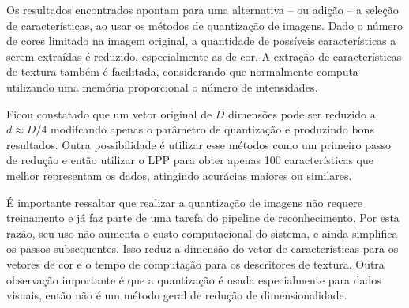 


Os resultados encontrados apontam para uma alternativa -- ou adição -- a seleção de características, ao usar os métodos de quantização de imagens. Dado o número de cores limitado na imagem original, a quantidade de possíveis características a serem extraídas é reduzido, especialmente as de cor. A extração de características de textura também é facilitada, considerando que normalmente computa utilizando uma memória proporcional o número de intensidades.

Ficou constatado que um vetor original de $D$ dimensões pode ser reduzido a $d \approx D/4$ modifcando apenas o parâmetro de quantização e produzindo bons resultados. Outra possibilidade é utilizar esse métodos como um primeiro passo de redução e então utilizar o LPP para obter apenas 100 características que melhor representam os dados, atingindo acurácias maiores ou similares.

É importante ressaltar que realizar a quantização de imagens não requere treinamento e já faz parte de uma tarefa do pipeline de reconhecimento. Por esta razão, seu uso não aumenta o custo computacional do sistema, e ainda simplifica os passos subsequentes. Isso reduz a dimensão do vetor de características para os vetores de cor e o tempo de computação para os descritores de textura. Outra observação importante é que a quantização é usada especialmente para dados visuais, então não é um método geral de redução de dimensionalidade.

